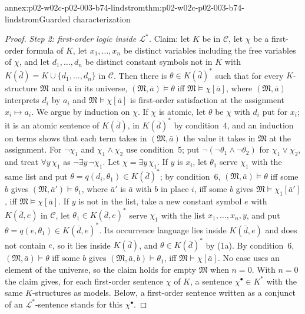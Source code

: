 \begin{annexitem}{annex:p02-w02c-p02-003-b74-lindstrom}{thm:p02-w02c-p02-003-b74-lindstrom}{Guarded characterization}
\begin{proof}
\emph{Step 2: first-order logic inside \(\mathcal L^{\ast}\).}  Claim: let
\(K\) be in \(\mathcal C\), let \(\chi\) be a first-order formula of \(K\),
let \(x_1,\ldots,x_n\) be distinct variables including the free variables
of \(\chi\), and let \(d_1,\ldots,d_n\) be distinct constant symbols not in
\(K\) with \(K(\bar d)=K\cup\{d_1,\ldots,d_n\}\) in \(\mathcal C\).  Then
there is \(\theta\in K(\bar d)^{\ast}\) such that for every \(K\)-structure
\(\mathfrak M\) and \(\bar a\) in its universe,
\((\mathfrak M,\bar a)\models\theta\) iff \(\mathfrak M\models\chi[\bar a]\),
where \((\mathfrak M,\bar a)\) interprets \(d_i\) by \(a_i\) and
\(\mathfrak M\models\chi[\bar a]\) is first-order satisfaction at the
assignment \(x_i\mapsto a_i\).  We argue by induction on \(\chi\).  If
\(\chi\) is atomic, let \(\theta\) be \(\chi\) with \(d_i\) put for
\(x_i\); it is an atomic sentence of \(K(\bar d)\), in \(K(\bar d)^{\ast}\)
by condition~4, and an induction on terms shows that each term takes in
\((\mathfrak M,\bar a)\) the value it takes in \(\mathfrak M\) at the
assignment.  For \(\neg\chi_1\) and \(\chi_1\land\chi_2\) use condition~5;
put \(\neg(\neg\theta_1\land\neg\theta_2)\) for \(\chi_1\lor\chi_2\), and
treat \(\forall y\,\chi_1\) as \(\neg\exists y\,\neg\chi_1\).  Let
\(\chi=\exists y\,\chi_1\).  If \(y\) is \(x_i\), let \(\theta_1\) serve
\(\chi_1\) with the same list and put \(\theta=q(d_i,\theta_1)\in
K(\bar d)^{\ast}\); by condition~6, \((\mathfrak M,\bar a)\models\theta\) iff
some \(b\) gives \((\mathfrak M,\bar a')\models\theta_1\), where \(\bar a'\)
is \(\bar a\) with \(b\) in place \(i\), iff some \(b\) gives
\(\mathfrak M\models\chi_1[\bar a']\), iff \(\mathfrak M\models\chi[\bar a]\).
If \(y\) is not in the list, take a new constant symbol \(e\) with
\(K(\bar d,e)\) in \(\mathcal C\), let \(\theta_1\in K(\bar d,e)^{\ast}\)
serve \(\chi_1\) with the list \(x_1,\ldots,x_n,y\), and put
\(\theta=q(e,\theta_1)\in K(\bar d,e)^{\ast}\).  Its occurrence language
lies inside \(K(\bar d,e)\) and does not contain \(e\), so it lies inside
\(K(\bar d)\), and \(\theta\in K(\bar d)^{\ast}\) by (1a).  By condition~6,
\((\mathfrak M,\bar a)\models\theta\) iff some \(b\) gives
\((\mathfrak M,\bar a,b)\models\theta_1\), iff \(\mathfrak M\models\chi[\bar a]\).
No case uses an element of the universe, so the claim holds for empty
\(\mathfrak M\) when \(n=0\).  With \(n=0\) the claim gives, for each
first-order sentence \(\chi\) of \(K\), a sentence \(\chi^{\bullet}\in
K^{\ast}\) with the same \(K\)-structures as models.  Below, a first-order
sentence written as a conjunct of an \(\mathcal L^{\ast}\)-sentence stands
for this \(\chi^{\bullet}\).


\end{proof}
\end{annexitem}
